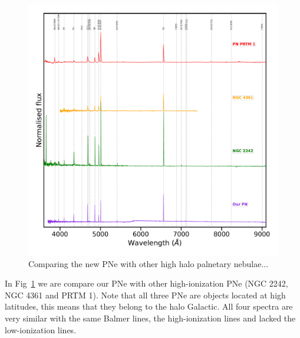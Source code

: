 \documentclass[twocolumn]{article}
\begin{document}
\newpage
\begin{figure}
\centering
\includegraphics[width=0.89\linewidth]{../Figs/spectra-compare.pdf}
  \caption{Comparing the new PNe with other high halo palnetary nebulae...} 
  \label{fig:compare-spectra}
\end{figure}

In Fig~\ref{fig:compare-spectra} we are compare our PNe with other high-ionization PNe (NGC 2242, NGC 4361 and PRTM 1).
Note that all three PNe are objects located at high latitudes, this means that they belong to the halo Galactic.
All four spectra are very similar with the same Balmer lines, the high-ionization lines and lacked the low-ionization lines.
\end{document}
